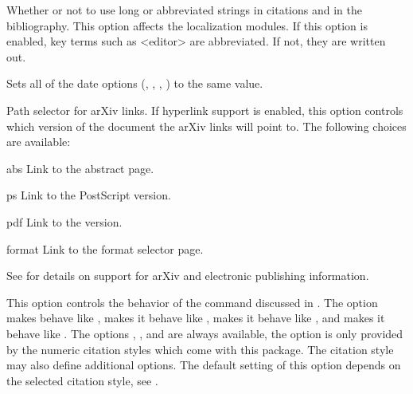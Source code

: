 \documentclass{ltxdockit}[2011/03/25]
\begin{document}
\begin{optionlist}


Whether or not to use long or abbreviated strings in citations and in the bibliography. This option affects the localization modules. If this option is enabled, key terms such as <editor> are abbreviated. If not, they are written out.


Sets all of the date options (, , , ) to the same value.


Path selector for arXiv links. If hyperlink support is enabled, this option controls which version of the document the arXiv  links will point to. The following choices are available:

\begin{valuelist}
\item[abs] Link to the abstract page.
\item[ps] Link to the PostScript version.
\item[pdf] Link to the \pdf version.
\item[format] Link to the format selector page.
\end{valuelist}

See  for details on support for arXiv and electronic publishing information.


This option controls the behavior of the  command discussed in . The  option makes  behave like ,  makes it behave like ,  makes it behave like , and  makes it behave like . The options , , and  are always available, the  option is only provided by the numeric citation styles which come with this package. The citation style may also define additional options. The default setting of this option depends on the selected citation style, see .



\end{optionlist}
\end{document}

